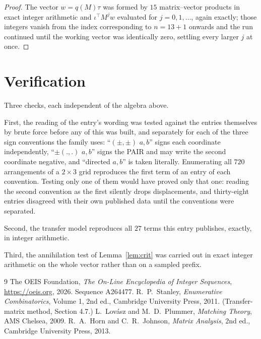 \documentclass[11pt,a4paper]{article}
\theoremstyle{plain}
\theoremstyle{definition}
\begin{document}
\begin{proof}
The vector $w=q(M)\tau$ was formed by $15$ matrix--vector products in exact integer
arithmetic and $\iota^{\!\top}M^{j}w$ evaluated for $j=0,1,\dots$, again exactly; those
integers vanish from the index corresponding to $n=13+1$ onwards and the run continued
until the working vector was identically zero, settling every larger $j$ at once.
\end{proof}

\section{Verification}

Three checks, each independent of the algebra above.

First, the reading of the entry's wording was tested against the entries themselves by brute
force before any of this was built, and separately for each of the three sign conventions the
family uses: ``$(\pm,\pm)$ $a,b$'' signs each coordinate independently, ``$\pm(.,.)$ $a,b$''
signs the PAIR and may write the second coordinate negative, and ``directed $a,b$'' is taken
literally. Enumerating all $720$ arrangements of a $2\times3$ grid reproduces the first term
of an entry of each convention. Testing only one of them would have proved only that one:
reading the second convention as the first silently drops displacements, and thirty-eight
entries disagreed with their own published data until the conventions were separated.

Second, the transfer model reproduces all $27$ terms this entry publishes, exactly, in
integer arithmetic.

Third, the annihilation test of Lemma~\ref{lem:crit} was carried out in exact integer
arithmetic on the whole vector rather than on a sampled prefix.

\begin{thebibliography}{9}
 The OEIS Foundation, \emph{The On-Line Encyclopedia of Integer
Sequences}, \url{https://oeis.org}, 2026. Sequence A264477.
 R.~P.~Stanley, \emph{Enumerative Combinatorics}, Volume 1, 2nd ed.,
Cambridge University Press, 2011. (Transfer-matrix method, Section 4.7.)
 L.~Lov\'asz and M.~D.~Plummer, \emph{Matching Theory}, AMS Chelsea, 2009.
 R.~A.~Horn and C.~R.~Johnson, \emph{Matrix Analysis}, 2nd ed., Cambridge
University Press, 2013.
\end{thebibliography}
\end{document}

